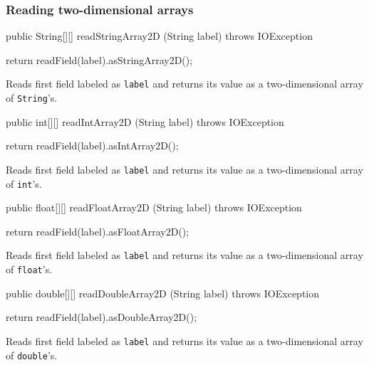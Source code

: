 \subsubsection*{Reading two-dimensional arrays}
\begin{code}

   public String[][] readStringArray2D (String label) throws IOException \begin{hide} {
      return readField(label).asStringArray2D();
   }
   \end{hide}
\end{code}
\begin{tabb}
Reads first field labeled as \texttt{label} and returns its value as a two-dimensional array of \texttt{String}'s.
\end{tabb}
\begin{code}

   public int[][] readIntArray2D (String label) throws IOException \begin{hide} {
      return readField(label).asIntArray2D();
   }
   \end{hide}
\end{code}
\begin{tabb}
Reads first field labeled as \texttt{label} and returns its value as a two-dimensional array of \texttt{int}'s.
\end{tabb}
\begin{code}

   public float[][] readFloatArray2D (String label) throws IOException \begin{hide} {
      return readField(label).asFloatArray2D();
   }
   \end{hide}
\end{code}
\begin{tabb}
Reads first field labeled as \texttt{label} and returns its value as a two-dimensional array of \texttt{float}'s.
\end{tabb}
\begin{code}

   public double[][] readDoubleArray2D (String label) throws IOException \begin{hide} {
      return readField(label).asDoubleArray2D();
   }
   \end{hide}
\end{code}
\begin{tabb}
Reads first field labeled as \texttt{label} and returns its value as a two-dimensional array of \texttt{double}'s.
\end{tabb}

